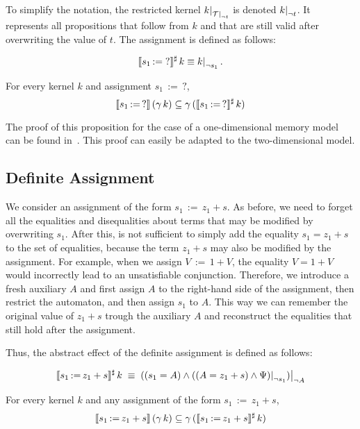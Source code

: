 To simplify the notation, the restricted kernel $\restr{k}{\restr{\T}{\neg t}}$ is denoted $\restr{k}{\neg t}$.
It represents all propositions that follow from $k$ and that are still valid after overwriting the value of $t$.
The assignment is defined as follows:

\[
	\sem{s_1\,{:=}\;?}^\sharp\,k \equiv \restr{k}{\neg s_1}.
\]

\begin{proposition}\label{p:ass-unknown}
	For every kernel $k$ and assignment $s_1\,{:=}\,?$,
	\[
		\llbracket s_1\,{:=}\,?\rrbracket\,(\gamma\,k) \subseteq \gamma\,(\llbracket s_1\,{:=}\,?\rrbracket^\sharp\,k)
	\]
\end{proposition}

The proof of this proposition for the case of a one-dimensional memory model can be found in~\cite{2pointer}.
This proof can easily be adapted to the two-dimensional model.

\subsection{Definite Assignment}

We consider an assignment of the form $s_1\,{:=}\,z_1+s$.
As before, we need to forget all the equalities and disequalities about terms that may be modified by overwriting $s_1$.
After this, is not sufficient to simply add the equality $s_1 = z_1+s$ to the set of equalities,
because the term $z_1 + s$ may also be modified by the assignment. For example, when we assign $V\,{:=}\,1+V$, the equality $V = 1 + V$ would incorrectly lead to an unsatisfiable conjunction.
Therefore, we introduce a fresh auxiliary $A$ and first assign $A$ to the right-hand side of the assignment, then restrict the automaton, and then assign $s_1$ to $A$.
This way we can remember the original value of $z_1 + s$ trough the auxiliary $A$ and reconstruct the equalities that still hold after the assignment.

Thus, the abstract effect of the definite assignment is defined as follows:

\[
	\sem{s_1\,{:=}\,z_1+s}^\sharp\,k\;\equiv\;
	\restr{((s_1=A)\land\restr{((A=z_1+s)\land\Psi)}{\neg s_1})}{\neg A}
\]

\begin{proposition}\label{p:ass-definite}
	For every kernel $k$ and any assignment of the form $s_1\,{:=}\,z_1+s$,
	\[
		\llbracket s_1\,{:=}\,z_1+s\rrbracket\,(\gamma\,k) \subseteq \gamma\,(\llbracket s_1\,{:=}\,z_1+s\rrbracket^\sharp\,k)
	\]
\end{proposition}

